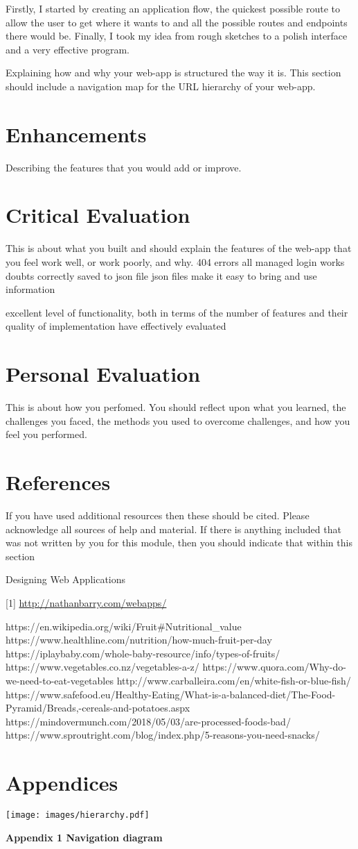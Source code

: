 \documentclass[10pt, a4paper]{article}
\begin{document}
    Firstly, I started by creating an application flow, the quickest possible route to allow the user to get where it wants to and all the possible routes and endpoints there would be. Finally, I took my idea from rough sketches to a polish interface and a very effective program.

    Explaining how and why your web-app is structured the way it is. This section should include a navigation map for the URL hierarchy of your web-app.

    \section{Enhancements}

    Describing the features that you would add or improve.

    \section{Critical Evaluation}
    This is about what you built and should explain the features of the web-app that
you feel work well, or work poorly, and why.
404 errors all managed
login works
doubts correctly saved to json file
json files make it easy to bring and use information

 excellent level of functionality, both in terms of the number of
features and their quality of implementation
 have effectively evaluated

    \section{Personal Evaluation}
    This is about how you perfomed. You should reflect upon what you learned,
the challenges you faced, the methods you used to overcome challenges, and how you feel you
performed.

    \section{References}
    If you have used additional resources then these should be cited. Please acknowledge all
sources of help and material. If there is anything included that was not written by you for this
module, then you should indicate that within this section

    Designing Web Applications

    [1] \url{http://nathanbarry.com/webapps/}

https://en.wikipedia.org/wiki/Fruit#Nutritional_value
https://www.healthline.com/nutrition/how-much-fruit-per-day
https://iplaybaby.com/whole-baby-resource/info/types-of-fruits/
https://www.vegetables.co.nz/vegetables-a-z/
https://www.quora.com/Why-do-we-need-to-eat-vegetables
http://www.carballeira.com/en/white-fish-or-blue-fish/
https://www.safefood.eu/Healthy-Eating/What-is-a-balanced-diet/The-Food-Pyramid/Breads,-cereals-and-potatoes.aspx
https://mindovermunch.com/2018/05/03/are-processed-foods-bad/
https://www.sproutright.com/blog/index.php/5-reasons-you-need-snacks/

    \section{Appendices}

    \texttt{[image: images/hierarchy.pdf]}

    \textbf{Appendix 1 Navigation diagram}
    \vspace{2mm}
\end{document}
